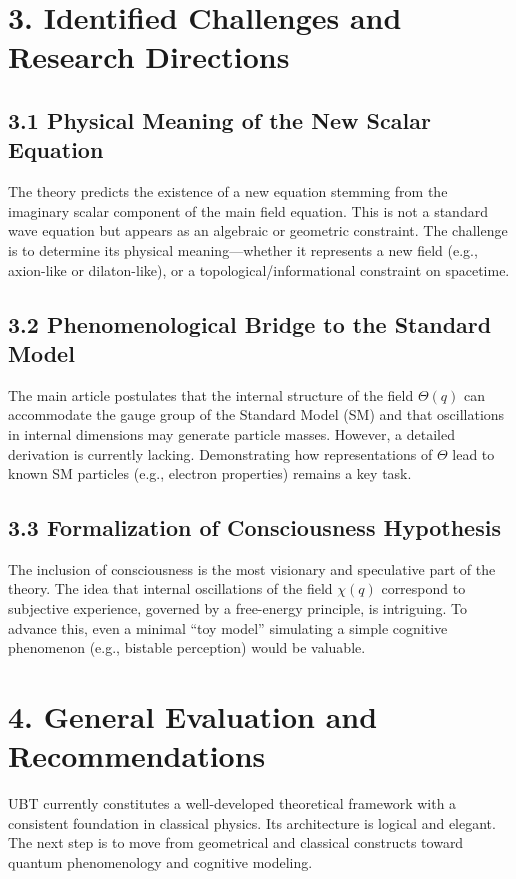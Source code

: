 \documentclass[12pt]{article}
\begin{document}
\section*{3. Identified Challenges and Research Directions}

\subsection*{3.1 Physical Meaning of the New Scalar Equation}

The theory predicts the existence of a new equation stemming from the imaginary scalar component of the main field equation. This is not a standard wave equation but appears as an algebraic or geometric constraint. The challenge is to determine its physical meaning—whether it represents a new field (e.g., axion-like or dilaton-like), or a topological/informational constraint on spacetime.

\subsection*{3.2 Phenomenological Bridge to the Standard Model}

The main article postulates that the internal structure of the field \( \Theta(q) \) can accommodate the gauge group of the Standard Model (SM) and that oscillations in internal dimensions may generate particle masses. However, a detailed derivation is currently lacking. Demonstrating how representations of \( \Theta \) lead to known SM particles (e.g., electron properties) remains a key task.

\subsection*{3.3 Formalization of Consciousness Hypothesis}

The inclusion of consciousness is the most visionary and speculative part of the theory. The idea that internal oscillations of the field \( \chi(q) \) correspond to subjective experience, governed by a free-energy principle, is intriguing. To advance this, even a minimal “toy model” simulating a simple cognitive phenomenon (e.g., bistable perception) would be valuable.

\section*{4. General Evaluation and Recommendations}

UBT currently constitutes a well-developed theoretical framework with a consistent foundation in classical physics. Its architecture is logical and elegant. The next step is to move from geometrical and classical constructs toward quantum phenomenology and cognitive modeling.
\end{document}
